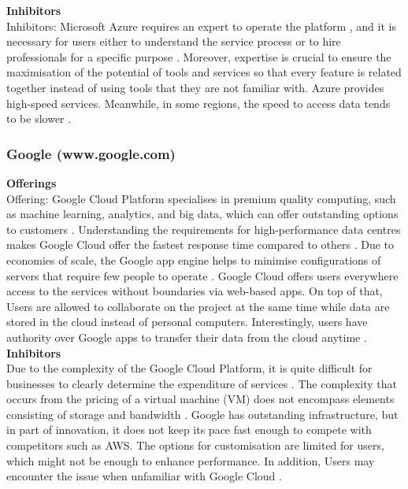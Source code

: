 \documentclass[12pt,a4paper]{article}
\begin{document}
\noindent\textbf{Inhibitors }\\
Inhibitors: Microsoft Azure requires an expert to operate the platform \citep{question_3.8}, and it is necessary for users either to understand the service process or to hire professionals for a specific purpose \citep{question_3.9}. Moreover, expertise is crucial to ensure the maximisation of the potential of tools and services so that every feature is related together instead of using tools that they are not familiar with. Azure provides high-speed services. Meanwhile, in some regions, the speed to access data tends to be slower \citep{question_3.9}.


\subsubsection{Google (www.google.com) } 
\noindent\textbf{Offerings}\\
Offering: Google Cloud Platform specialises in premium quality computing, such as machine learning, analytics, and big data, which can offer outstanding options to customers \citep{question_3.10}. Understanding the requirements for high-performance data centres makes Google Cloud offer the fastest response time compared to others \citep{question_3.10}. Due to economies of scale, the Google app engine helps to minimise configurations of servers that require few people to operate \citep{question_3.11}. Google Cloud offers users everywhere access to the services without boundaries via web-based apps. On top of that, Users are allowed to collaborate on the project at the same time while data are stored in the cloud instead of personal computers. Interestingly, users have authority over Google apps to transfer their data from the cloud anytime \citep{question_3.11}. \\

\noindent\textbf{Inhibitors }\\
Due to the complexity of the Google Cloud Platform, it is quite difficult for businesses to clearly determine the expenditure of services \citep{question_3.12}. The complexity that occurs from the pricing of a virtual machine (VM) does not encompass elements consisting of storage and bandwidth \citep{question_3.12}. Google has outstanding infrastructure, but in part of innovation, it does not keep its pace fast enough to compete with competitors such as AWS. The options for customisation are limited for users, which might not be enough to enhance performance. In addition, Users may encounter the issue when unfamiliar with Google Cloud \citep{question_3.13}.


\pagebreak



	
\def\UrlBreaks{\do\/\do-}

\clearpage
\end{document}
